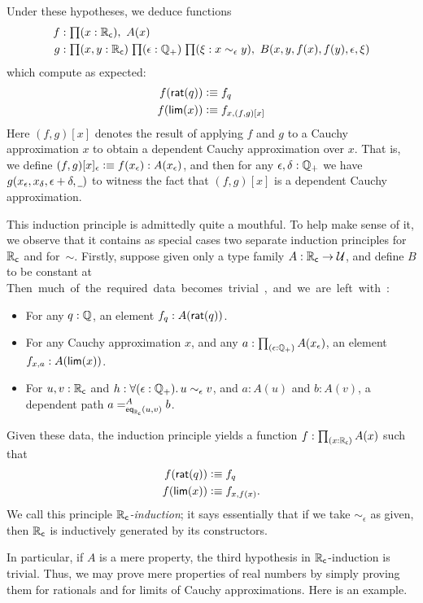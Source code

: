 Under these hypotheses, we deduce functions
\begin{align*}
  f&:\prd{x:\RC} A(x)\\
  g&:\prd{x,y:\RC}{\epsilon:\Qp}{\xi:x\sim_{\epsilon} y} B(x,y,f(x),f(y),\epsilon,\xi)
\end{align*}
which compute as expected:
\begin{align*}
  f(\rcrat(q)) &\defeq f_q\\
  f(\rclim(x)) &\defeq f_{x,(f,g)[x]}
\end{align*}
Here $(f,g)[x]$ denotes the result of applying $f$ and $g$ to a Cauchy approximation $x$ to obtain a dependent Cauchy approximation over $x$.
That is, we define $(f,g)[x]_\epsilon \defeq f(x_\epsilon) : A(x_\epsilon)$, and then for any $\epsilon,\delta:\Qp$ we have $g(x_\epsilon,x_\delta,\epsilon+\delta,\blank)$ to witness the fact that $(f,g)[x]$ is a dependent Cauchy approximation.

This induction principle is admittedly quite a mouthful.
To help make sense of it, we observe that it contains as special cases two separate induction principles for~$\RC$ and for~$\sim$.
Firstly, suppose given only a type family $A:\RC\to\type$, and define $B$ to be constant at \unit.
Then much of the required data becomes trivial, and we are left with:
\begin{itemize}
\item For any $q : \Q$, an element $f_q:A(\rcrat(q))$.
\item For any Cauchy approximation $x$, and any $a:\prd{\epsilon:\Qp} A(x_\epsilon)$, an element $f_{x,a}:A(\rclim(x))$.
\item For $u, v : \RC$ and $h:\fall{\epsilon : \Qp} u \sim_\epsilon v$, and $a:A(u)$ and $b:A(v)$, a dependent path $\dpath{A}{\rceq(u,v)}{a}{b}$.
\end{itemize}
Given these data, the induction principle yields a function $f:\prd{x:\RC} A(x)$ such that
\begin{align*}
  f(\rcrat(q)) &\defeq f_q\\
  f(\rclim(x)) &\defeq f_{x,f(x)}.
\end{align*}
We call this principle \emph{$\RC$-induction}; it says essentially that if we take $\sim_\epsilon$ as given, then $\RC$ is inductively generated by its constructors.

In particular, if $A$ is a mere property, the third hypothesis in $\RC$-induction is trivial.
Thus, we may prove mere properties of real numbers by simply proving them for rationals and for limits of Cauchy approximations.
Here is an example.

